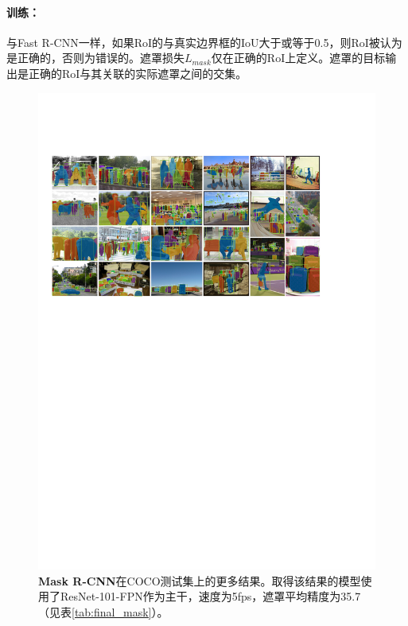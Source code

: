 \paragraph{训练：} 与Fast R-CNN一样，如果RoI的与真实边界框的IoU大于或等于0.5，则RoI被认为是正确的，否则为错误的。遮罩损失$L_{mask}$仅在正确的RoI上定义。遮罩的目标输出是正确的RoI与其关联的实际遮罩之间的交集。

\begin{figure}[t]
\centering
\includegraphics[width=1.0\linewidth]{figures/mask_rcnn/results_more}
\caption{\textbf{Mask R-CNN}在COCO测试集上的更多结果。取得该结果的模型使用了ResNet-101-FPN作为主干，速度为5fps，遮罩平均精度为35.7（见表\ref{tab:final_mask}）。}
\label{fig:results_more}
\end{figure}


